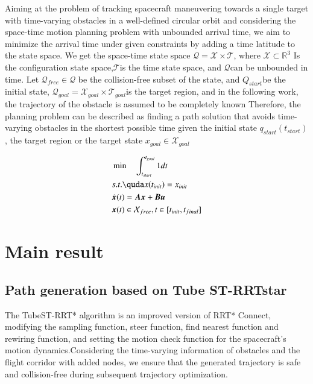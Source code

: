 \documentclass[times,authoryear]{elsarticle}
\begin{document}
Aiming at the problem of tracking spacecraft maneuvering towards a single target with time-varying obstacles in a well-defined circular orbit and considering the space-time motion planning problem with unbounded arrival time, we aim to minimize the arrival time under given constraints by adding a time latitude to the state space. We get the space-time state space $\mathcal{Q} = \mathcal{X} \times \mathcal{T}$, where $\mathcal{X} \subset \mathbb{R}^3$ Is the configuration state space,$\mathcal{T}$is the time state space, and $\mathcal{Q}$can be unbounded in time. Let $\mathcal{Q}_{free}\in \mathcal{Q}$ be the collision-free subset of the state, and $Q_{start}$be the initial state, $\mathcal{Q}_{goal} = \mathcal{X}_{goal} \times \mathcal{T}_{goal}$is the target region, and in the following work, the trajectory of the obstacle is assumed to be completely known
Therefore, the planning problem can be described as finding a path solution that avoids time-varying obstacles in the shortest possible time given the initial state $q_{start}(t_{start})$, the target region or the target state $x_{goal} \in \mathcal{X}_{goal}$

\begin{equation}
  \begin{align}
    \label{problem}
    &\min \quad \int_{t_{start}}^{t_{goal}}1dt \\
    &s.t. \quda x(t_{init}) = x_{init} \\
    &\dot{\boldsymbol{x}}(t) = \boldsymbol{A}\boldsymbol{x}+\boldsymbol{B}\boldsymbol{u}\\
    & \boldsymbol{x}(t) \in \mathcal{X}_{free},t \in [t_{init},t_{final}]
  \end{align}
\end{equation}


\section{Main result}

\subsection{Path generation based on Tube ST-RRTstar}

The TubeST-RRT* algorithm is an improved version of RRT* Connect, modifying the sampling function, steer function, find nearest function and rewiring function, and setting the motion check function for the spacecraft's motion dynamics.Considering the time-varying information of obstacles and the flight corridor with added nodes, we ensure that the generated trajectory is safe and collision-free during subsequent trajectory optimization. 
\end{document}
